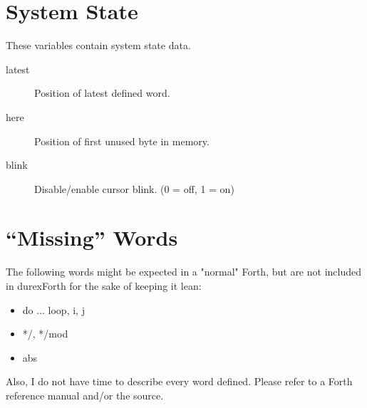 \section{System State}

These variables contain system state data.

\begin{description}

\item[latest] Position of latest defined word.

\item[here] Position of first unused byte in memory.

\item[blink] Disable/enable cursor blink. (0 = off, 1 = on)

\end{description}



\section{``Missing'' Words}

The following words might be expected in a "normal" Forth, but are not included in durexForth for the sake of keeping it lean:

\begin{itemize}
\item do ... loop, i, j
\item */, */mod
\item abs
\end{itemize}

Also, I do not have time to describe every word defined. Please refer to a Forth reference manual and/or the source.
